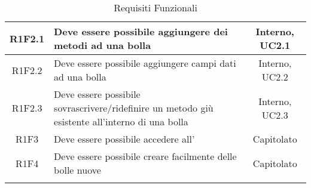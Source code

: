 \begin{longtable}{|c|>{\centering}m{7cm}|c|}
			\hline
			R1F2.1 & Deve essere possibile aggiungere dei metodi ad una bolla & Interno, UC2.1 \\
			\hline
			R1F2.2 & Deve essere possibile aggiungere campi dati ad una bolla & Interno, UC2.2 \\
			\hline
			R1F2.3 & Deve essere possibile sovrascrivere/ridefinire un metodo giù esistente all'interno di una bolla & Interno, UC2.3 \\
			\hline
			R1F3 & Deve essere possibile accedere all'\termine{SDK} & Capitolato \\
			\hline
			R1F4 & Deve essere possibile creare facilmente delle bolle nuove & Capitolato \\
			\hline				
\caption[Requisiti Funzionali]{Requisiti Funzionali}
\label{tabella: Requisiti Funzionali}
\end{longtable}
\endgroup
\clearpage
